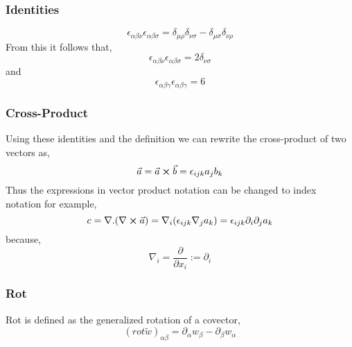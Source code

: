 \subsubsection{Identities}
\begin{equation}
\epsilon_{\alpha \beta \nu}\epsilon_{\alpha \beta \sigma} = \delta_{\mu \rho} \delta_{\nu \sigma} - \delta_{\mu \sigma}\delta_{\nu \rho}
\end{equation}
From this it follows that,
\begin{equation}
\epsilon_{\alpha \beta \nu}\epsilon_{\alpha \beta \sigma} = 2\delta_{\nu \sigma}
\end{equation}
and
\begin{equation}
\epsilon_{\alpha \beta \gamma}\epsilon_{\alpha \beta \gamma} = 6
\end{equation}
\subsubsection{Cross-Product}
Using these identities and the definition we can rewrite the cross-product of two vectors as,
\begin{equation}
\vec{a} = \vec{a} \cross \vec{b}  = \epsilon_{ijk}a_{j}b_{k}
\end{equation}
Thus the expressions in vector product notation can be changed to index notation for example,
$$
c = \nabla.(\nabla \cross \vec{a}) = \nabla_{i}(\epsilon_{ijk}\nabla_{j}a_{k}) = \epsilon_{ijk}\partial_{i}\partial_{j}a_{k}
$$
because,
$$\nabla_{i} = \frac{\partial}{\partial x_{i}} := \partial_{i}$$
\subsubsection{Rot}
Rot is defined as the generalized rotation of a covector,
\begin{equation}
{(rot \tilde{w})}_{\alpha \beta} = \partial_{\alpha} w_{\beta} - \partial_{\beta}w_{\alpha}
\end{equation}
